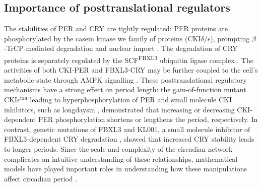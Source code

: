 \subsection{Importance of posttranslational regulators}
The stabilities of PER and CRY are tightly regulated: PER proteins are phosphorylated by the casein kinase we family of proteins (CKI$\delta/\epsilon$), prompting $\beta$-TrCP-mediated degradation \cite{Reischl2007} and nuclear import \cite{Takano2004}. 
The degradation of CRY proteins is separately regulated by the SCF\textsuperscript{FBXL3} ubiquitin ligase complex \cite{Busino2007, Godinho2007, Siepka2007}. 
The activities of both CKI-PER and FBXL3-CRY may be further coupled to the cell's metabolic state through AMPK signalling \cite{Lee2013}. 
These posttranslational regulatory mechanisms have a strong effect on period length: the gain-of-function mutant CKI$\epsilon^\mathrm{tau}$ leading to hyperphosphorylation of PER \cite{Gallego2006} and small molecule CKI inhibitors, such as longdaysin \cite{Hirota2010}, demonstrated that increasing or decreasing CKI-dependent PER phosphorylation shortens or lengthens the period, respectively. 
In contrast, genetic mutations of FBXL3 \cite{Godinho2007, Siepka2007} and KL001, a small molecule inhibitor of FBXL3-dependent CRY degradation \cite{Hirota2012}, showed that increased CRY stability leads to longer periods. 
Since the scale and complexity of the circadian network complicates an intuitive understanding of these relationships, mathematical models have played important roles in understanding how these manipulations affect circadian period \cite{Gallego2006, Hirota2012, Reischl2007}.

